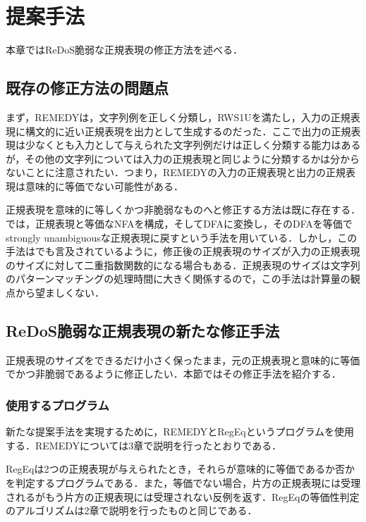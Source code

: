 \documentclass[a4paper, 12pt, dvipdfmx, uplatex]{jsreport}
\begin{document}
\chapter{提案手法}
本章ではReDoS脆弱な正規表現の修正方法を述べる．

\section{既存の修正方法の問題点}\label{issue}
まず，REMEDYは，文字列例を正しく分類し，RWS1Uを満たし，入力の正規表現に構文的に近い正規表現を出力として生成するのだった．ここで出力の正規表現は少なくとも入力として与えられた文字列例だけは正しく分類する能力はあるが，その他の文字列については入力の正規表現と同じように分類するかは分からないことに注意されたい．つまり，REMEDYの入力の正規表現と出力の正規表現は意味的に等価でない可能性がある．

正規表現を意味的に等しくかつ非脆弱なものへと修正する方法は既に存在する．\cite{harmless}では，正規表現と等価なNFAを構成，そしてDFAに変換し，そのDFAを等価でstrongly unambiguousな正規表現に戻すという手法を用いている．しかし，この手法は\cite{harmless}でも言及されているように，修正後の正規表現のサイズが入力の正規表現のサイズに対して二重指数関数的になる場合もある．正規表現のサイズは文字列のパターンマッチングの処理時間に大きく関係するので，この手法は計算量の観点から望ましくない．

\section{ReDoS脆弱な正規表現の新たな修正手法}
正規表現のサイズをできるだけ小さく保ったまま，元の正規表現と意味的に等価でかつ非脆弱であるように修正したい．本節ではその修正手法を紹介する．

\subsection{使用するプログラム}
新たな提案手法を実現するために，REMEDYとRegEq\cite{regeq}というプログラムを使用する．REMEDYについては3章で説明を行ったとおりである．


RegEqは2つの正規表現が与えられたとき，それらが意味的に等価であるか否かを判定するプログラムである．また，等価でない場合，片方の正規表現には受理されるがもう片方の正規表現には受理されない反例を返す．RegEqの等価性判定のアルゴリズムは2章で説明を行ったものと同じである．
\end{document}
